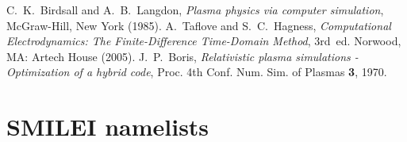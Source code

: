 \documentclass[11pt,a4paper]{article}
\begin{document}

\begin{thebibliography}{2}

 C.~K.~Birdsall and A.~B.~Langdon, {\it Plasma physics via computer simulation}, McGraw-Hill, New York (1985).
 A.~Taflove and S.~C.~Hagness, {\it Computational Electrodynamics: The Finite-Difference Time-Domain Method}, 3rd~ed. Norwood, MA: Artech House (2005).
 J.~P.~Boris, {\it Relativistic plasma simulations - Optimization of a hybrid code}, Proc. 4th Conf. Num. Sim. of Plasmas {\bf 3}, 1970.


\end{thebibliography}

\vfill\eject

\section*{SMILEI namelists}



\clearpage

\end{document}
